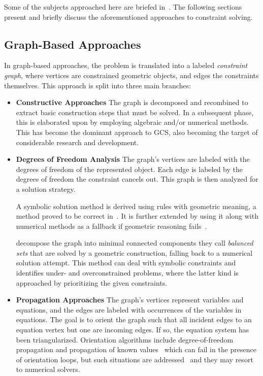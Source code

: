 Some of the subjects approached here are briefed in~\cite{Hoffmann:2005:BCS}.
The following sections present and briefly discuss the aforementioned approaches
to constraint solving.

\subsection{Graph-Based Approaches}%
\label{sec:intro.constraints.graph}

In graph-based approaches, the problem is translated into a labeled
\textit{constraint graph}, where vertices are constrained geometric objects, and
edges the constraints themselves.  This approach is split into three main
branches:

\begin{itemize}
  \item[] \textbf{Constructive Approaches} The graph is decomposed and
  recombined to extract basic construction steps that must be solved.  In a
  subsequent phase, this is elaborated upon by employing algebraic and/or
  numerical methods.  This has become the dominant approach to \ac{GCS}, also
  becoming the target of considerable research and development.

  \item[] \textbf{Degrees of Freedom Analysis} The graph's vertices are labeled
  with the degrees of freedom of the represented object.  Each edge is labeled
  by the degrees of freedom the constraint cancels out.  This graph is then
  analyzed for a solution strategy.

  A symbolic solution method is derived using rules with geometric meaning, a
  method proved to be correct in~\cite{Kramer:1990:SGCS}.  It is further
  extended by using it along with numerical methods as a fallback if geometric
  reasoning fails~\cite{Hsu:1997:HCSEIGC}.

   decompose the graph into minimal connected components
  they call \textit{balanced sets} that are solved by a geometric construction,
  falling back to a numerical solution attempt.  This method can deal with
  symbolic constraints and identifies under- and overconstrained problems, where
  the latter kind is approached by prioritizing the given constraints.

  \item[] \textbf{Propagation Approaches} The graph's vertices represent
  variables and equations, and the edges are labeled with occurrences of the
  variables in equations.  The goal is to orient the graph such that all
  incident edges to an equation vertex but one are incoming edges.  If so, the
  equation system has been triangularized.  Orientation algorithms include
  degree-of-freedom propagation and propagation of known
  values~\cite{Freeman:1990:ICS,Veltkamp:1992:Geometric} which can fail in the
  presence of orientation loops, but such situations are
  addressed~\cite{Veltkamp:1992:Geometric} and they may resort to numerical
  solvers.
\end{itemize}

